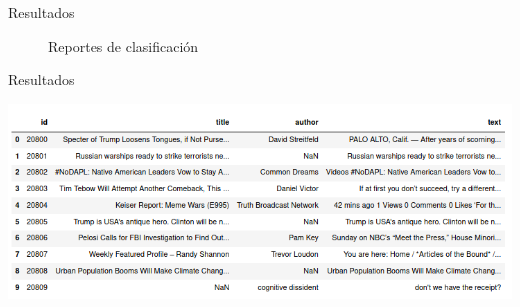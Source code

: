 \documentclass[11pt]{beamer}
\begin{document}
\begin{frame}{Resultados}
    \begin{figure}%
    \centering
    \qquad
    \caption{Reportes de clasificación}%
    \label{fig:example}%
    \end{figure}
\end{frame}

\begin{frame}{Resultados}
    \begin{center}
        \includegraphics[width=1\textwidth]{imagenes/dataframe2.png}
    \end{center}
\end{frame}
\end{document}
